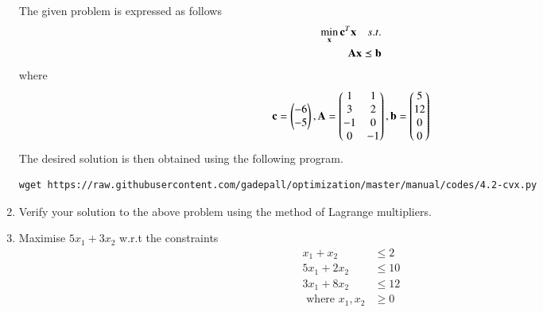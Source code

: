 \documentclass[journal,12pt,twocolumn]{IEEEtran}
\renewcommand\thesection{\arabic{section}}
\begin{document}
\begin{enumerate}[label=\thesection.\arabic*,ref=\thesection.\theenumi]
\solution
The given problem is expressed as follows
%
\begin{align}
\min_{\mathbf{x}}	\mathbf{c}^{T}\mathbf{x}\quad s.t.
\\
\mathbf{A}\mathbf{x} \preceq \mathbf{b}
\end{align}
%
where
%
\begin{equation}
\mathbf{c}
=
\begin{pmatrix}
-6
\\
-5
\end{pmatrix},
\mathbf{A} = 
\begin{pmatrix}
1 & 1
\\
3 & 2
\\
-1 & 0
\\
0 & -1
\end{pmatrix},
\mathbf{b}
= 
\begin{pmatrix}
5
\\
12
\\
0
\\
0 
\end{pmatrix}
\end{equation}
%	
The desired solution is then obtained using the following program.
%
%
%
\begin{lstlisting}
wget https://raw.githubusercontent.com/gadepall/optimization/master/manual/codes/4.2-cvx.py
\end{lstlisting}

\item
	Verify your solution to the above problem using the method of Lagrange multipliers.

%
\item
	 Maximise $5x_1 + 3x_2$ w.r.t the constraints
	 \begin{align}
	 x_1 + x_2 &\leq 2 \nonumber\\
	 5x_1 + 2x_2 &\leq 10 \nonumber\\
	 3x_1 + 8x_2 &\leq 12 \nonumber\\
	 \text{ where } x_1,x_2 &\geq 0 \nonumber
	 \end{align}	

\end{enumerate}
%
\end{document}
